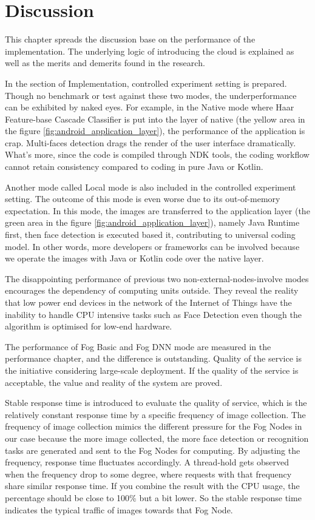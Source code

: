 \chapter{Discussion} \label{chap:discussion}
This chapter spreads the discussion base on the performance of the implementation. The underlying logic of introducing the cloud is explained as well as the merits and demerits found in the research.

In the section of Implementation, controlled experiment setting is prepared. Though no benchmark or test against these two modes, the underperformance can be exhibited by naked eyes. For example, in the Native mode where Haar Feature-base Cascade Classifier is put into the layer of native (the yellow area in the figure \ref{fig:android_application_layer}), the performance of the application is crap. Multi-faces detection drags the render of the user interface dramatically. What's more, since the code is compiled through NDK tools, the coding workflow cannot retain consistency compared to coding in pure Java or Kotlin.

Another mode called Local mode is also included in the controlled experiment setting. The outcome of this mode is even worse due to its out-of-memory expectation. In this mode, the images are transferred to the application layer (the green area in the figure \ref{fig:android_application_layer}), namely Java Runtime first, then face detection is executed based it, contributing to universal coding model. In other words, more developers or frameworks can be involved because we operate the images with Java or Kotlin code over the native layer.

The disappointing performance of previous two non-external-nodes-involve modes encourages the dependency of computing units outside. They reveal the reality that low power end devices in the network of the Internet of Things have the inability to handle CPU intensive tasks such as Face Detection even though the algorithm is optimised for low-end hardware.

The performance of Fog Basic and Fog DNN mode are measured in the performance chapter, and the difference is outstanding. Quality of the service is the initiative considering large-scale deployment. If the quality of the service is acceptable, the value and reality of the system are proved.

Stable response time is introduced to evaluate the quality of service, which is the relatively constant response time by a specific frequency of image collection. The frequency of image collection mimics the different pressure for the Fog Nodes in our case because the more image collected, the more face detection or recognition tasks are generated and sent to the Fog Nodes for computing. By adjusting the frequency, response time fluctuates accordingly. A thread-hold gets observed when the frequency drop to some degree, where requests with that frequency share similar response time. If you combine the result with the CPU usage, the percentage should be close to 100\% but a bit lower. So the stable response time indicates the typical traffic of images towards that Fog Node.

